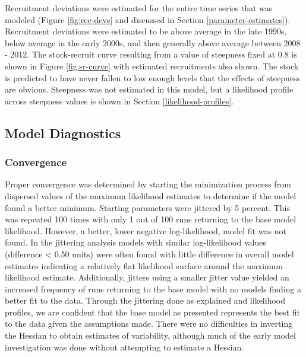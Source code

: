 \documentclass[11pt,
  english,
  a4paper,
]{article}
\begin{document}
\leavevmode\tagmcend\tagstructend\par


Recruitment deviations were estimated for the entire time series that was modeled (Figure \ref{fig:rec-devs} and discussed in Section \ref{parameter-estimates}). Recruitment deviations were estimated to be above average in the late 1990s, below average in the early 2000s, and then generally above average between 2008 - 2012. The stock-recruit curve resulting from a value of steepness fixed at 0.8 is shown in Figure \ref{fig:sr-curve} with estimated recruitments also shown. The stock is predicted to have never fallen to low enough levels that the effects of steepness are obvious. Steepness was not estimated in this model, but a likelihood profile across steepness values is shown in Section \ref{likelihood-profiles}.

\leavevmode\tagmcend\tagstructend\par


\hypertarget{model-diagnostics}{%
\subsection{Model Diagnostics}\label{model-diagnostics}}

\leavevmode\tagmcend\tagstructend


\hypertarget{convergence}{%
\subsubsection{Convergence}\label{convergence}}

\leavevmode\tagmcend\tagstructend


Proper convergence was determined by starting the minimization process from dispersed values of the maximum likelihood estimates to determine if the model found a better minimum. Starting parameters were jittered by 5 percent. This was repeated 100 times with only 1 out of 100 runs returning to the base model likelihood. However, a better, lower negative log-likelihood, model fit was not found. In the jittering analysis models with similar log-likelihood values (difference \textless{} 0.50 units) were often found with little difference in overall model estimates indicating a relatively flat likelihood surface around the maximum likelihood estimate. Additionally, jitters using a smaller jitter value yielded an increased frequency of runs returning to the base model with no models finding a better fit to the data. Through the jittering done as explained and likelihood profiles, we are confident that the base model as presented represents the best fit to the data given the assumptions made. There were no difficulties in inverting the Hessian to obtain estimates of variability, although much of the early model investigation was done without attempting to estimate a Hessian.
\end{document}
